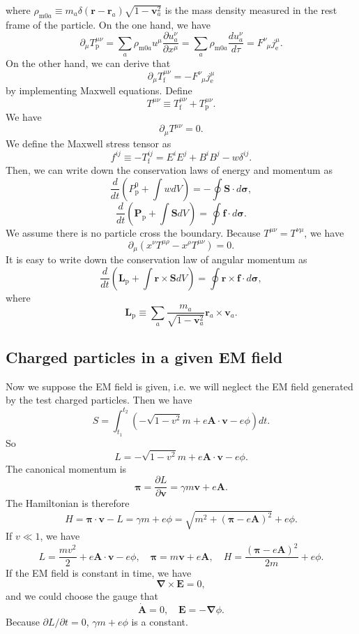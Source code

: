 where $\rho_{\mathrm{m}0a} \equiv m_a \delta(\bm{r}-\bm{r}_a) \sqrt{1-\bm{v}_a^2}$ is the mass density measured in the rest frame of the particle.
On the one hand, we have
\[\partial_{\mu} T_{\mathrm{p}}^{\mu\nu} = \sum_a \rho_{\mathrm{m}0a}u^{\mu} \frac{\partial u_a^{\nu}}{\partial x^{\mu}} = \sum_a \rho_{\mathrm{m}0a} \frac{d u_a^{\nu}}{d \tau} = F^{\nu}_{\phantom{\nu}\mu}j_{\mathrm{e}}^{\mu}.\]
On the other hand, we can derive that
\[\partial_{\mu} T_{\mathrm{f}}^{\mu\nu} = - F^{\nu}_{\phantom{\nu}\mu}j_{\mathrm{e}}^{\mu}\]
by implementing Maxwell equations.
Define
\[T^{\mu \nu} \equiv T_{\mathrm{f}}^{\mu\nu} + T_{\mathrm{p}}^{\mu\nu}.\]
We have
\[\partial_{\mu} T^{\mu\nu} = 0.\]
We define the Maxwell stress tensor as
\[f^{ij} \equiv -T_{\mathrm{f}}^{ij} = E^{i}E^{j} + B^{i}B^{j} - w\delta^{ij}.\]
Then, we can write down the conservation laws of energy and momentum as
\[\frac{d}{dt}\left(P_{\mathrm{p}}^0 + \int w dV \right) = -\oint \bm{S}\cdot d\bm{\sigma},\]
\[\frac{d}{dt}\left(\bm{P}_{\mathrm{p}} + \int \bm{S} dV \right) = \oint \bm{f}\cdot d\bm{\sigma}.\]
We assume there is no particle cross the boundary.
Because $T^{\mu\nu} = T^{\nu\mu}$, we have
\[\partial_{\mu}(x^{\nu}T^{\mu\rho}-x^{\rho}T^{\mu\nu}) = 0.\]
It is easy to write down the conservation law of angular momentum as
\[\frac{d}{dt}\left(\bm{L}_{\mathrm{p}} + \int \bm{r} \times \bm{S} dV \right) = \oint \bm{r} \times \bm{f}\cdot d\bm{\sigma},\]
where
\[\bm{L}_{\mathrm{p}} \equiv \sum_a \frac{m_a}{\sqrt{1-\bm{v}_a^2}} \bm{r}_a  \times \bm{v}_a .\]

\subsection{Charged particles in a given EM field}
Now we suppose the EM field is given, i.e. we will neglect the EM field generated by the test charged particles. Then we have
\[S = \int_{t_1}^{t_2} (-\sqrt{1-v^2}m + e\bm{A}\cdot\bm{v}-e\phi)dt.\]
So
\[L = -\sqrt{1-v^2}m + e\bm{A}\cdot\bm{v}-e\phi.\]
The canonical momentum is
\[\bm{\pi} = \frac{\partial L}{\partial \bm{v}} = \gamma m \bm{v} + e \bm{A}.\]
The Hamiltonian is therefore
\[H = \bm{\pi} \cdot \bm{v} - L = \gamma m + e \phi = \sqrt{m^2+(\bm{\pi}-e\bm{A})^2}+e\phi.\]
If $v \ll 1$, we have
\[L = \frac{mv^2}{2} + e\bm{A}\cdot\bm{v}-e\phi , \quad \bm{\pi} =  m \bm{v} + e \bm{A} , \quad H = \frac{(\bm{\pi}-e\bm{A})^2}{2m}+e\phi.\]
If the EM field is constant in time, we have
\[\bm{\nabla} \times \bm{E} = 0 ,\]
and we could choose the gauge that
\[\dot{\bm{A}} = 0 , \quad \bm{E} = -\bm{\nabla} \phi.\]
Because $\partial L/{\partial t}=0$, $\gamma m + e\phi$ is a constant.

